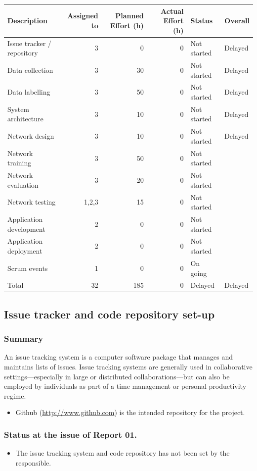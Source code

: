 \documentclass{article}
\begin{document}
\begin{center}
\begin{tabular}{lrrrll}
Description & Assigned to & Planned Effort (h) & Actual Effort (h) & Status & Overall\\
\hline
Issue tracker / repository & 3 & 0 & 0 & Not started & Delayed\\
Data collection & 3 & 30 & 0 & Not started & Delayed\\
Data labelling & 3 & 50 & 0 & Not started & Delayed\\
System architecture & 3 & 10 & 0 & Not started & Delayed\\
Network design & 3 & 10 & 0 & Not started & Delayed\\
Network training & 3 & 50 & 0 & Not started & \\
Network evaluation & 3 & 20 & 0 & Not started & \\
Network testing & 1,2,3 & 15 & 0 & Not started & \\
Application development & 2 & 0 & 0 & Not started & \\
Application deployment & 2 & 0 & 0 & Not started & \\
Scrum events & 1 & 0 & 0 & On going & \\
\hline
Total & 32 & 185 & 0 & Delayed & Delayed\\
\end{tabular}
\end{center}

\subsection{Issue tracker and code repository set-up}
\label{sec:orgaa653dc}
\subsubsection{Summary}
\label{sec:org7f31186}
An issue tracking system is a computer software package that manages and maintains lists of issues.
Issue tracking systems are generally used in collaborative settings—especially in large or distributed collaborations—but can also be employed by individuals as part of a time management or personal productivity regime.

\begin{itemize}
\item Github (\url{http://www.github.com}) is the intended repository for the project.
\end{itemize}
\subsubsection{Status at the issue of Report 01.}
\label{sec:orgd87f46a}
\begin{itemize}
\item The issue tracking system and code repository has not been set by the responsible.
\end{itemize}
\end{document}
